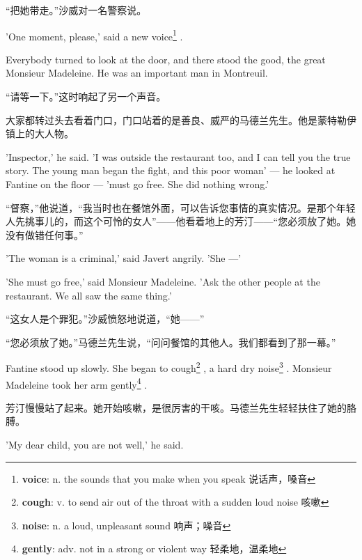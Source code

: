 \documentclass[fontset=ubuntu, zihao=5]{ctexart}
\begin{document}
\begin{paracol}{2}
“把她带走。”沙威对一名警察说。

\switchcolumn*

'One moment, please,' said a new voice\footnote{\textbf{voice}: n. the sounds that you make when you speak 说话声，嗓音}
.

Everybody turned to look at the door, and there stood the good, the great Monsieur Madeleine. He was an important man in Montreuil.

\switchcolumn

“请等一下。”这时响起了另一个声音。

大家都转过头去看着门口，门口站着的是善良、威严的马德兰先生。他是蒙特勒伊镇上的大人物。

\switchcolumn*

'Inspector,' he said. 'I was outside the restaurant too, and I can tell you
the true story. The young man began the fight, and this poor woman' --- he
looked at Fantine on the floor --- 'must go free. She did nothing wrong.'

\switchcolumn

“督察，”他说道，“我当时也在餐馆外面，可以告诉您事情的真实情况。是那个年轻人先挑事儿的，而这个可怜的女人”——他看着地上的芳汀——“您必须放了她。她没有做错任何事。”

\switchcolumn*

'The woman is a criminal,' said Javert angrily. 'She ---'


'She must go free,' said Monsieur Madeleine. 'Ask the other people at the restaurant. We all saw the same thing.'


\switchcolumn

“这女人是个罪犯。”沙威愤怒地说道，“她——”

“您必须放了她。”马德兰先生说，“问问餐馆的其他人。我们都看到了那一幕。”

\switchcolumn*

Fantine stood up slowly. She began to cough\footnote{\textbf{cough}: v. to
  send air out of the throat with a sudden loud noise 咳嗽} , a hard dry
noise\footnote{\textbf{noise}: n. a loud, unpleasant sound 响声；噪音}
. Monsieur Madeleine took her arm gently\footnote{\textbf{gently}: adv. not in a strong or violent way 轻柔地，温柔地}
.

\switchcolumn

芳汀慢慢站了起来。她开始咳嗽，是很厉害的干咳。马德兰先生轻轻扶住了她的胳膊。


\switchcolumn*

'My dear child, you are not well,' he said.


\end{paracol}
\end{document}
